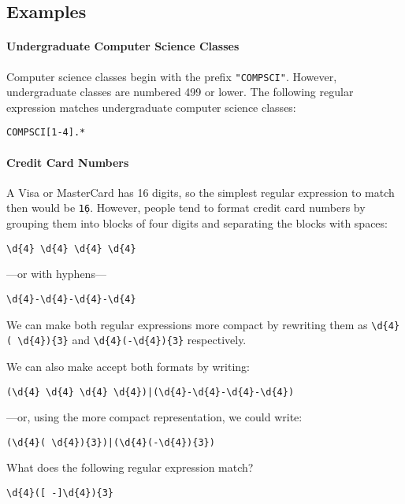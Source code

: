 \documentclass[9pt]{extbook}
\begin{document}
\subsection{Examples}

\paragraph{Undergraduate Computer Science Classes} Computer science classes begin with the prefix \texttt{"COMPSCI"}. However, undergraduate classes are numbered 499 or lower. The following regular expression matches undergraduate computer science classes:

\texttt{COMPSCI[1-4].*}

\paragraph{Credit Card Numbers}
A Visa or MasterCard has 16 digits, so the simplest regular expression to match then would be \texttt{\d{16}}. However, people tend to format credit card numbers by grouping them into blocks of four digits and separating the blocks with spaces:

\begin{verbatim}
\d{4} \d{4} \d{4} \d{4}
\end{verbatim}

---or with hyphens---

\begin{verbatim}
\d{4}-\d{4}-\d{4}-\d{4}
\end{verbatim}

We can make both regular expressions more compact by rewriting them as \verb|\d{4}( \d{4}){3}| and \verb|\d{4}(-\d{4}){3}| respectively.

We can also make accept both formats by writing:

\begin{verbatim}
(\d{4} \d{4} \d{4} \d{4})|(\d{4}-\d{4}-\d{4}-\d{4})
\end{verbatim}

---or, using the more compact representation, we could write:
\begin{verbatim}
(\d{4}( \d{4}){3})|(\d{4}(-\d{4}){3})
\end{verbatim}


\begin{think}

What does the following regular expression match?

\begin{verbatim}
\d{4}([ -]\d{4}){3}
\end{verbatim}
\end{think}
\end{document}
